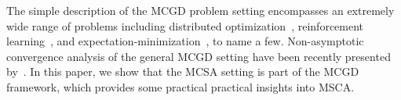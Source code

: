 The simple description of the MCGD problem setting encompasses an extremely wide range of problems including distributed optimization~\citep{ram_incremental_2009}, reinforcement learning~\citep{tadic_asymptotic_2017, doan_convergence_2020, Xiong_Xu_Liang_Zhang_2021}, and expectation-minimization~\citep{pmlr-v99-karimi19a}, to name a few.
Non-asymptotic convergence analysis of the general MCGD setting have been recently presented by~\citet{duchi_ergodic_2012, pmlr-v99-karimi19a, doan_convergence_2020, Xiong_Xu_Liang_Zhang_2021}.
In this paper, we show that the MCSA setting is part of the MCGD framework, which provides some practical practical insights into MSCA.

